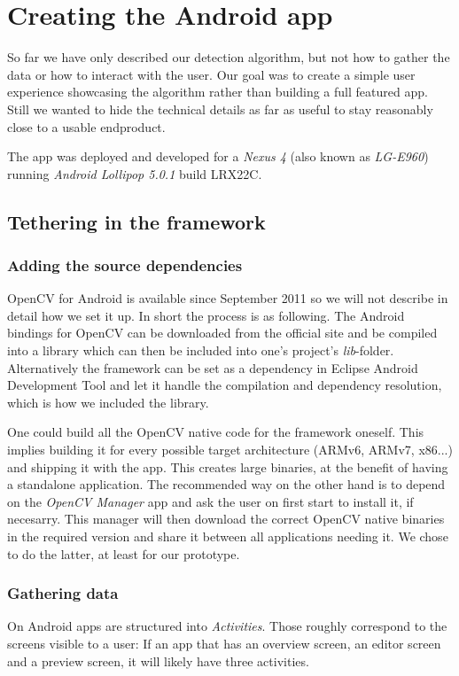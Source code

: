 
\chapter{Creating the Android app}
\label{android}
	So far we have only described our detection algorithm, but not how to gather the data or how to interact with the user. Our goal was to create a simple user experience showcasing the algorithm rather than building a full featured app. Still we wanted to hide the technical details as far as useful to stay reasonably close to a usable endproduct.

	The app was deployed and developed for a \textit{Nexus 4} (also known as \textit{LG-E960}) running \textit{Android Lollipop 5.0.1} build LRX22C.

	\section{Tethering in the framework}
	\label{android-framework}
	\subsection{Adding the source dependencies}
	\label{android-framework-dependencies}
	OpenCV for Android is available since September 2011 so we will not describe in detail how we set it up. In short the process is as following. The Android bindings for OpenCV can be downloaded from the official site and be compiled into a library which can then be included into one's project's \textit{lib}-folder. Alternatively the framework can be set as a dependency in Eclipse Android Development Tool and let it handle the compilation and dependency resolution, which is how we included the library.

	One could build all the OpenCV native code for the framework oneself. This implies building it for every possible target architecture (ARMv6, ARMv7, x86...) and shipping it with the app. This creates large binaries, at the benefit of having a standalone application. The recommended way on the other hand is to depend on the \textit{OpenCV Manager} app and ask the user on first start to install it, if necesarry. This manager will then download the correct OpenCV native binaries in the required version and share it between all applications needing it. We chose to do the latter, at least for our prototype.

	\subsection{Gathering data}
	\label{android-framework-gathering}
	On Android apps are structured into \textit{Activities}. Those roughly correspond to the screens visible to a user: If an app that has an overview screen, an editor screen and a preview screen, it will likely have three activities.

